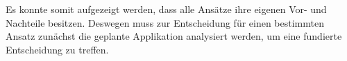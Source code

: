Es konnte somit aufgezeigt werden, dass alle Ansätze ihre eigenen Vor- und Nachteile besitzen. Deswegen muss zur Entscheidung für einen bestimmten Ansatz zunächst die geplante Applikation analysiert werden, um eine fundierte Entscheidung zu treffen.



